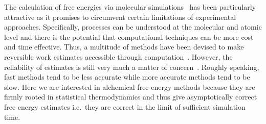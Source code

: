 \documentclass[journal=jctcce,manuscript=article]{achemso}
\begin{document}
The calculation of free energies via molecular simulations~\cite{hansen_practical_2014, doi:10.1021/jp102971x,
  Gallicchio201127, doi:10.1080/08927022.2015.1132317,
  doi:10.1146/annurev.matsci.32.111901.153708} has been particularly
attractive as it promises to circumvent certain limitations of experimental
approaches. Specifically, processes can be understood at the molecular and atomic level and 
there is the potential that computational techniques can be more cost and time effective.  Thus, a
multitude of methods have been devised to make reversible work
estimates accessible through computation~\cite{hansen_practical_2014,
  doi:10.1021/jp102971x, Gallicchio201127,
  doi:10.1080/08927022.2015.1132317,
  doi:10.1146/annurev.matsci.32.111901.153708}.  However, the
reliability of estimates is still very much a matter of
concern~\cite{doi:10.1021/jp102971x, doi:10.1021/acs.jctc.5b00179}.
Roughly speaking, fast methods tend to be less accurate while more
accurate methods tend to be slow.  Here we are interested in alchemical free 
energy methods because they are firmly rooted in statistical thermodynamics and 
thus give asymptotically correct free energy estimates i.e.\ they are correct 
in the limit of sufficient simulation time.
\end{document}
